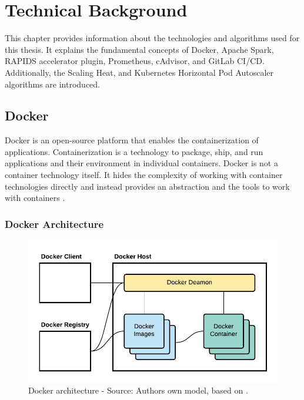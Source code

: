 \chapter{Technical Background}
\label{chap:04_background}

This chapter provides information about the technologies and algorithms used for this thesis. It explains the fundamental concepts of Docker, Apache Spark, RAPIDS accelerator plugin, Prometheus, cAdvisor, and GitLab CI/CD. Additionally, the Scaling Heat, and Kubernetes Horizontal Pod Autoscaler algorithms are introduced.

\section{Docker}
\label{sec:04_docker}
Docker is an open-source platform that enables the containerization of applications. Containerization is a technology to package, ship, and run applications and their environment in individual containers.
Docker is not a container technology itself. It hides the complexity of working with container technologies directly and instead provides an abstraction and the tools to work with containers \cite{Nickoloff2019Docker, Bullington2020Docker, Potdar2020Docker}.


\subsection{Docker Architecture}
\label{subsec:04_docker_architecture}
\begin{figure}[h]
\centering
\includegraphics[scale=1]{images/04_technical_background/docker/docker_architecture}
\caption{Docker architecture - Source: Authors own model, based on \cite{Docker2020Docs}.}
\label{fig:04_docker_architecture_architecture}
\end{figure}


